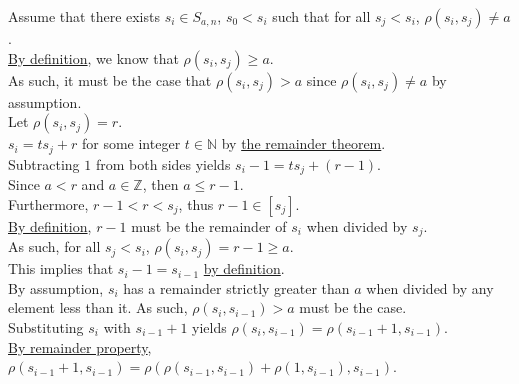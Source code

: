 \documentclass[a4paper,12pt]{article}
\begin{document}
\noindent Assume that there exists $s_i \in S_{a, n}$, $s_0 < s_i$ such that for all $s_j < s_i$, $\rho(s_i, s_j) \neq a$.\\

\noindent \hyperlink{definition:awkward_number_series}{By definition}, we know that $\rho(s_i, s_j) \geq a$.\\

\noindent As such, it must be the case that $\rho(s_i, s_j) > a$ since $\rho(s_i, s_j) \neq a$ by assumption.\\

\noindent Let $\rho(s_i, s_j) = r$.\\

\noindent $s_i = ts_j + r$ for some integer $t \in \mathbb{N}$ by \hyperlink{theorem:remainder_theorem}{the remainder theorem}.\\

\noindent Subtracting $1$ from both sides yields $s_i - 1 = ts_j + (r - 1)$.\\

\noindent Since $a < r$ and $a \in \mathbb{Z}$, then $a \leq r - 1$.\\

\noindent Furthermore, $r - 1 < r < s_j$, thus $r - 1 \in [s_j]$.\\

\noindent \hyperlink{theorem:remainder_theorem}{By definition}, $r - 1$ must be the remainder of $s_i$ when divided by $s_j$.\\

\noindent As such, for all $s_j < s_i$, $\rho(s_i, s_j) = r - 1 \geq a$.\\

\noindent This implies that $s_i - 1 = s_{i - 1}$ \hyperlink{definition:awkward_number_series}{by definition}.\\

\noindent By assumption, $s_i$ has a remainder strictly greater than $a$ when divided by any element less than it. As such, $\rho(s_i, s_{i - 1}) > a$ must be the case.\\

\noindent Substituting $s_i$ with $s_{i - 1} + 1$ yields $\rho(s_i, s_{i - 1}) = \rho(s_{i - 1} + 1, s_{i - 1})$.\\

\noindent \hyperlink{remainder_properties}{By remainder property}, $\rho(s_{i - 1} + 1, s_{i - 1}) = \rho(\rho(s_{i - 1}, s_{i - 1}) + \rho(1, s_{i - 1}), s_{i - 1})$.\\
\end{document}
